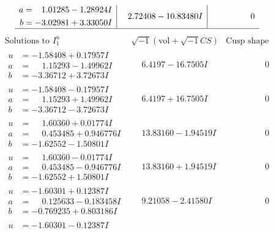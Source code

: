 \documentclass[1p]{elsarticle_modified}
\theoremstyle{definition}
\newcommand{\I}{\sqrt{-1}}
\begin{document}
$$\begin{array}{c|c|c}
\begin{aligned}
a &= \phantom{-}1.01285 - 1.28924 I \\
b &= -3.02981 + 3.33050 I\end{aligned}
 & \phantom{-}2.72408 - 10.83480 I & \phantom{-0.000000 } 0\\
 \hline 
 \end{array}$$\newpage$$\begin{array}{c|c|c}  
\text{Solutions to }I^u_{1}& \I (\text{vol} + \sqrt{-1}CS) & \text{Cusp shape}\\
 \hline 
\begin{aligned}
u &= -1.58408 + 0.17957 I \\
a &= \phantom{-}1.15293 - 1.49962 I \\
b &= -3.36712 + 3.72673 I\end{aligned}
 & \phantom{-}6.4197 - 16.7505 I & \phantom{-0.000000 } 0 \\ \hline\begin{aligned}
u &= -1.58408 - 0.17957 I \\
a &= \phantom{-}1.15293 + 1.49962 I \\
b &= -3.36712 - 3.72673 I\end{aligned}
 & \phantom{-}6.4197 + 16.7505 I & \phantom{-0.000000 } 0 \\ \hline\begin{aligned}
u &= \phantom{-}1.60360 + 0.01774 I \\
a &= \phantom{-}0.453485 + 0.946776 I \\
b &= -1.62552 - 1.50801 I\end{aligned}
 & \phantom{-}13.83160 - 1.94519 I & \phantom{-0.000000 } 0 \\ \hline\begin{aligned}
u &= \phantom{-}1.60360 - 0.01774 I \\
a &= \phantom{-}0.453485 - 0.946776 I \\
b &= -1.62552 + 1.50801 I\end{aligned}
 & \phantom{-}13.83160 + 1.94519 I & \phantom{-0.000000 } 0 \\ \hline\begin{aligned}
u &= -1.60301 + 0.12387 I \\
a &= \phantom{-}0.125633 - 0.183458 I \\
b &= -0.769235 + 0.803186 I\end{aligned}
 & \phantom{-}9.21058 - 2.41580 I & \phantom{-0.000000 } 0 \\ \hline\begin{aligned}
u &= -1.60301 - 0.12387 I \\

\end{aligned}
\end{array}$$
\end{document}
